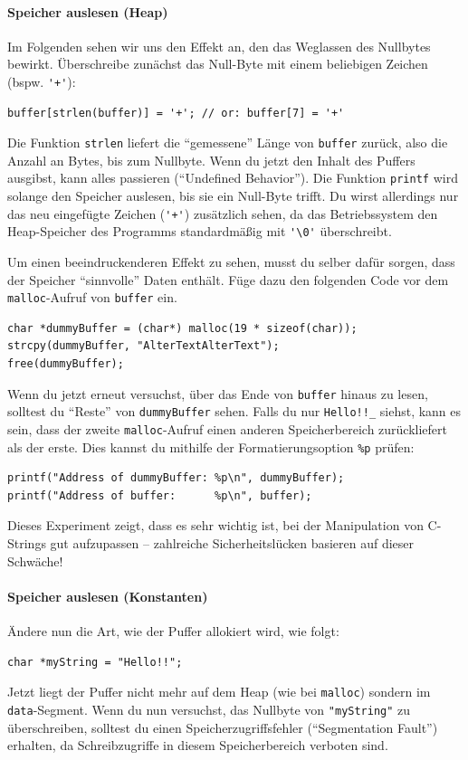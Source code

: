 \paragraph{Speicher auslesen (Heap)}
Im Folgenden sehen wir uns den Effekt an, den das Weglassen des Nullbytes bewirkt.
Überschreibe zunächst das Null-Byte mit einem beliebigen Zeichen (bspw. \lstinline|'+'|):
\begin{lstlisting}
buffer[strlen(buffer)] = '+'; // or: buffer[7] = '+'
\end{lstlisting}
Die Funktion \lstinline|strlen| liefert die \enquote{gemessene} Länge von \lstinline|buffer| zurück, also die Anzahl an Bytes, bis zum Nullbyte.
Wenn du jetzt den Inhalt des Puffers ausgibst, kann alles passieren (\enquote{Undefined Behavior}).
Die Funktion \lstinline|printf| wird solange den Speicher auslesen, bis sie ein Null-Byte trifft.
Du wirst allerdings nur das neu eingefügte Zeichen (\lstinline|'+'|) zusätzlich sehen, da das Betriebssystem den Heap-Speicher des Programms standardmäßig mit \lstinline|'\0'| überschreibt.

Um einen beeindruckenderen Effekt zu sehen, musst du selber dafür sorgen, dass der Speicher \enquote{sinnvolle} Daten enthält.
Füge dazu den folgenden Code vor dem \lstinline|malloc|-Aufruf von \lstinline|buffer| ein.
\begin{lstlisting}
char *dummyBuffer = (char*) malloc(19 * sizeof(char));
strcpy(dummyBuffer, "AlterTextAlterText");
free(dummyBuffer);
\end{lstlisting}
Wenn du jetzt erneut versuchst, über das Ende von \lstinline|buffer| hinaus zu lesen, solltest du \enquote{Reste} von \lstinline|dummyBuffer| sehen.
Falls du nur \lstinline|Hello!!_| siehst, kann es sein, dass der zweite \lstinline|malloc|-Aufruf einen anderen Speicherbereich zurückliefert als der erste.
Dies kannst du mithilfe der Formatierungsoption \lstinline|%p| prüfen:
\begin{lstlisting}
printf("Address of dummyBuffer: %p\n", dummyBuffer);
printf("Address of buffer:      %p\n", buffer);
\end{lstlisting}
Dieses Experiment zeigt, dass es sehr wichtig ist, bei der Manipulation von C-Strings gut aufzupassen -- 
zahlreiche Sicherheitslücken basieren auf dieser Schwäche!

\paragraph{Speicher auslesen (Konstanten)}
Ändere nun die Art, wie der Puffer allokiert wird, wie folgt:
\begin{lstlisting}
char *myString = "Hello!!";
\end{lstlisting}
Jetzt liegt der Puffer nicht mehr auf dem Heap (wie bei \lstinline|malloc|) sondern im \texttt{data}-Segment.
Wenn du nun versuchst, das Nullbyte von \lstinline|"myString"| zu überschreiben, solltest du einen Speicherzugriffsfehler (\enquote{Segmentation Fault}) erhalten, da Schreibzugriffe in diesem Speicherbereich verboten sind.

